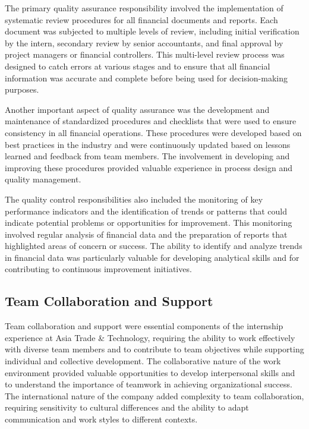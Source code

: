 The primary quality assurance responsibility involved the implementation of systematic review procedures for all financial documents and reports. Each document was subjected to multiple levels of review, including initial verification by the intern, secondary review by senior accountants, and final approval by project managers or financial controllers. This multi-level review process was designed to catch errors at various stages and to ensure that all financial information was accurate and complete before being used for decision-making purposes.

Another important aspect of quality assurance was the development and maintenance of standardized procedures and checklists that were used to ensure consistency in all financial operations. These procedures were developed based on best practices in the industry and were continuously updated based on lessons learned and feedback from team members. The involvement in developing and improving these procedures provided valuable experience in process design and quality management.

The quality control responsibilities also included the monitoring of key performance indicators and the identification of trends or patterns that could indicate potential problems or opportunities for improvement. This monitoring involved regular analysis of financial data and the preparation of reports that highlighted areas of concern or success. The ability to identify and analyze trends in financial data was particularly valuable for developing analytical skills and for contributing to continuous improvement initiatives.

\subsection{Team Collaboration and Support}
Team collaboration and support were essential components of the internship experience at Asia Trade \& Technology, requiring the ability to work effectively with diverse team members and to contribute to team objectives while supporting individual and collective development. The collaborative nature of the work environment provided valuable opportunities to develop interpersonal skills and to understand the importance of teamwork in achieving organizational success. The international nature of the company added complexity to team collaboration, requiring sensitivity to cultural differences and the ability to adapt communication and work styles to different contexts.

